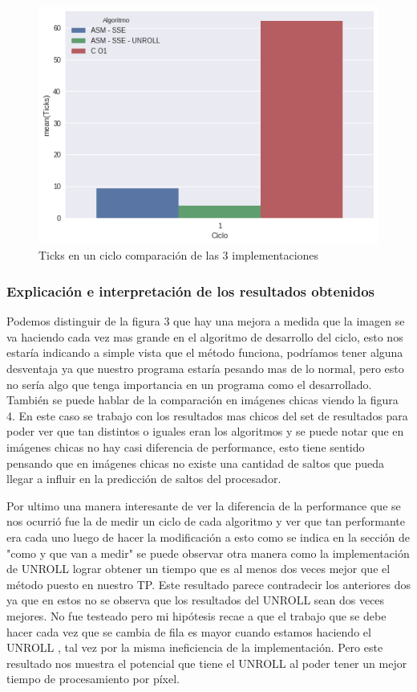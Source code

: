 \begin{figure}[H]
\centering
\includegraphics[scale=0.5]{img/fourCombine_ticks_en_ciclo.png}
\caption{Ticks en un ciclo comparación de las 3 implementaciones}
\label{sec:ticksciclo}
\end{figure}

\subsubsection*{Explicación e interpretación de los resultados obtenidos}
Podemos distinguir de la figura 3 que hay una mejora a medida que la imagen se va haciendo cada vez mas grande en el algoritmo de desarrollo del ciclo, esto nos estaría indicando a simple vista que el método funciona, podríamos tener alguna desventaja ya que nuestro programa estaría pesando mas de lo normal, pero esto no sería algo que tenga importancia en un programa como el desarrollado. También se puede hablar de la comparación en imágenes chicas viendo la figura 4. En este caso se trabajo con los resultados mas chicos del set de resultados para poder ver que tan distintos o iguales eran los algoritmos y se puede notar que en imágenes chicas no hay casi diferencia de performance, esto tiene sentido pensando que en imágenes chicas no existe una cantidad de saltos que pueda llegar a influir en la predicción de saltos del procesador.

Por ultimo una manera interesante de ver la diferencia de la performance que se nos ocurrió fue la de medir un ciclo de cada algoritmo y ver que tan performante era cada uno luego de hacer la modificación a esto como se indica en la sección de "como y que van a medir" se puede observar otra manera como la implementación de UNROLL lograr obtener un tiempo que es al menos dos veces mejor que el método puesto en nuestro TP. Este resultado parece contradecir los anteriores dos ya que en estos no se observa que los resultados del UNROLL sean dos veces mejores. No fue testeado pero mi hipótesis recae a que el trabajo que se debe hacer cada vez que se cambia de fila es mayor cuando estamos haciendo el UNROLL , tal vez por la misma ineficiencia de la implementación. Pero este resultado nos muestra el potencial que tiene el UNROLL al poder tener un mejor tiempo de procesamiento por píxel.

